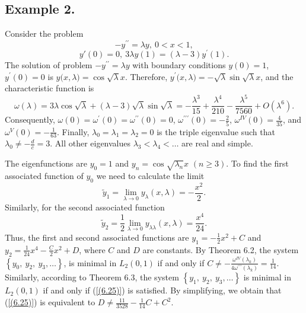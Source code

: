 \documentclass[pdflatex,sn-mathphys-num]{sn-jnl}%
\theoremstyle{thmstyleone}%
\theoremstyle{thmstyletwo}%
\theoremstyle{thmstylethree}%
\theoremstyle{definition}
\theoremstyle{remark}
\numberwithin{equation}{section}
\begin{document}
\subsection*{Example 2.}Consider the problem  
$$
-y^{\prime \prime }=\lambda y,\ 0<x<1,
$$
$$
y'(0)=0,\ 
3{\lambda}y(1)=\left( {\lambda }-3\right)y^{\prime }(1).
$$
The solution of problem $-y^{\prime \prime }=\lambda y$ with boundary conditions $y(0)=1$, $y^\prime(0)=0$ is $y({x,\lambda)}=\cos{\sqrt{\lambda}x}$. Therefore, $y^\prime({x,\lambda)}=-\sqrt{\lambda}\sin{\sqrt{\lambda}x}$, and
the characteristic function is \[\omega(\lambda) = 3\lambda\cos{\sqrt{\lambda}}+  (\lambda - 3)\sqrt{\lambda}\sin{\sqrt{\lambda}}=-\frac{\lambda^{3}}{15}+\frac{\lambda^{4}}{210}-\frac{\lambda^{5}}{7560}+O(\lambda^{6}).\]
Consequently, $\omega(0)=\omega^\prime(0)=\omega^{\prime\prime}(0)=0$, $\omega^{\prime\prime\prime}(0)=-\frac{2}{5}$, $\omega^{IV}(0)=\frac{4}{35}$, and $\omega^{V}(0)=-\frac{1}{63}$.
Finally, $\lambda _{0}=\lambda _{1}=\lambda _{2}=0$ is the triple eigenvalue such that $\lambda _{0}\neq-\frac{d}{c}=3$. All other eigenvalues $\lambda _{3}<\lambda _{4}<\ldots$ are real and simple.

The eigenfunctions are $y_{0}=1$ and $y_{n}=\cos{\sqrt{\lambda _{n}}x}$ $(n\ge 3)$.
To find the first associated function of $y_{0}$ we need to calculate the limit
$$\tilde{y}_1=\lim_{\lambda\to 0}y_\lambda(x,\lambda)=-\frac{x^2}{2}.$$
Similarly, for the second associated function
$$\tilde{y}_2=\frac{1}{2}\lim_{\lambda\to 0}y_{\lambda\lambda}(x,\lambda)=\frac{x^4}{24}.$$
Thus, the first and second associated functions are $y_{1}=-\frac{1}{2}x^2+C$ and $y_{2}=\frac{1}{24}x^4-\frac{C}{2}x^2+D$, where $C$ and $D$ are constants. By Theorem 6.2,
the system $\left\{ y_{0},\ y_{2},\ y_{3},\ldots\right\}$, is minimal in $L_2(0,1)$ if and only if $C\neq-\frac{\omega^{IV}(\lambda_k)}{4\omega^{\prime\prime\prime}(\lambda_k)}=\frac{1}{14}$. 
Similarly, according to Theorem 6.3,
the system $\left\{ y_{1},\ y_{2},\ y_{3},\ldots\right\}$ is minimal in $L_2(0,1)$ if and only if (\ref{(6.25)}) is satisfied. By simplifying, we obtain that (\ref{(6.25)}) is equivalent to $D\ne\frac{11}{3528}-\frac{1}{14} C+C^{2}$.
\end{document}
